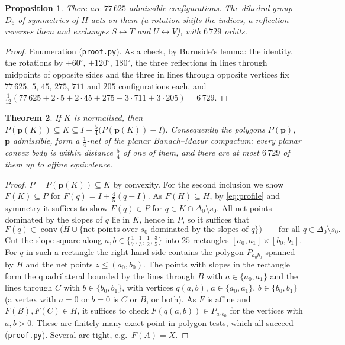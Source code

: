 \documentclass[11pt]{amsart}
\newtheorem{theorem}{Theorem}[section]
\newtheorem{proposition}[theorem]{Proposition}
\theoremstyle{definition}
\theoremstyle{remark}
\DeclareMathOperator{\conv}{conv}
\begin{document}
\begin{proposition}\label{prop:count}
There are $77\,625$ admissible configurations. The dihedral group $D_6$ of symmetries of $H$ acts on them
(a rotation shifts the indices, a reflection reverses them and exchanges $S\leftrightarrow T$ and
$U\leftrightarrow V$), with $6\,729$ orbits.
\end{proposition}

\begin{proof}
Enumeration (\texttt{proof.py}). As a check, by Burnside's lemma: the identity, the rotations by $\pm60^\circ$,
$\pm120^\circ$, $180^\circ$, the three reflections in lines through midpoints of opposite sides and the three in lines
through opposite vertices fix $77\,625$, $5$, $45$, $275$, $711$ and $205$ configurations each, and
$\frac1{12}(77\,625+2\cdot5+2\cdot45+275+3\cdot711+3\cdot205)=6\,729$.
\end{proof}

\begin{theorem}\label{thm:net}
If $K$ is normalised, then
$P(\mathbf p(K))\subseteq K\subseteq I+\tfrac54\bigl(P(\mathbf p(K))-I\bigr)$.
Consequently the polygons $P(\mathbf p)$, $\mathbf p$ admissible, form a $\frac14$-net of the planar Banach--Mazur
compactum: every planar convex body is within distance $\frac54$ of one of them, and there are at most $6\,729$ of
them up to affine equivalence.
\end{theorem}

\begin{proof}
$P=P(\mathbf p(K))\subseteq K$ by convexity. For the second inclusion we show $F(K)\subseteq P$ for
$F(q)=I+\frac45(q-I)$. As $F(H)\subseteq H$, by \eqref{eq:profile} and symmetry it suffices to show $F(q)\in P$ for
$q\in K\cap\Delta_0\setminus s_0$. All net points dominated by the slopes of $q$ lie in $K$, hence in $P$, so it suffices that
\[
  F(q)\in\conv\bigl(H\cup\{\text{net points over $s_0$ dominated by the slopes of }q\}\bigr)\qquad\text{for all }q\in\Delta_0\setminus s_0 .
\]
Cut the slope square along $a,b\in\{\frac17,\frac13,\frac12,\frac35\}$ into $25$ rectangles $[a_0,a_1]\times[b_0,b_1]$. For
$q$ in such a rectangle the right-hand side contains the polygon $P_{a_0b_0}$ spanned by $H$ and the net points
$z\le(a_0,b_0)$. The points with slopes in the rectangle form the quadrilateral bounded by the lines through $B$ with
$a\in\{a_0,a_1\}$ and the lines through $C$ with $b\in\{b_0,b_1\}$, with vertices $q(a,b)$, $a\in\{a_0,a_1\}$,
$b\in\{b_0,b_1\}$ (a vertex with $a=0$ or $b=0$ is $C$ or $B$, or both). As $F$ is affine and $F(B),F(C)\in H$, it suffices
to check $F(q(a,b))\in P_{a_0b_0}$ for the vertices with $a,b>0$. These are finitely many exact point-in-polygon
tests, which all succeed (\texttt{proof.py}). Several are tight, e.g.\ $F(A)=X$.
\end{proof}
\end{document}
